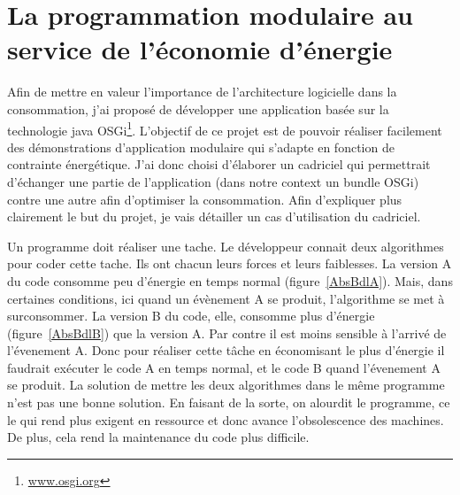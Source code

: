 \documentclass[a4paper, 11pt]{report}
\begin{document}

\chapter{La programmation modulaire au service de l'économie d'énergie}
Afin de mettre en valeur l'importance de l'architecture logicielle dans la consommation, j'ai proposé de développer une application basée sur la technologie java OSGi\footnote{\href{http://www.osgi.org}{www.osgi.org}}. L'objectif de ce projet est de pouvoir réaliser facilement des démonstrations d'application modulaire qui s'adapte en fonction de contrainte énergétique. J'ai donc choisi d'élaborer un cadriciel qui permettrait d'échanger une partie de l'application (dans notre context un \og bundle \fg OSGi) contre une autre afin d'optimiser la consommation. Afin d'expliquer plus clairement le but du projet, je vais détailler un cas d'utilisation du cadriciel.

Un programme doit réaliser une tache. Le développeur connait deux algorithmes pour coder cette tache. Ils ont chacun leurs forces et leurs faiblesses. La version A du code consomme peu d'énergie en temps normal (figure~\ref{AbsBdlA}). Mais, dans certaines conditions, ici quand un évènement A se produit, l'algorithme se met à surconsommer. La version B du code, elle, consomme plus d'énergie (figure~\ref{AbsBdlB}) que la version A. Par contre il est moins sensible à l'arrivé de l'évenement A. Donc pour réaliser cette tâche en économisant le plus d'énergie il faudrait exécuter le code A en temps normal, et le code B quand l'évenement A se produit. La solution de mettre les deux algorithmes dans le même programme n'est pas une bonne solution. En faisant de la sorte, on alourdit le programme, ce le qui rend plus exigent en ressource et donc avance l'obsolescence des machines. De plus, cela rend la maintenance du code plus difficile.
\end{document}
